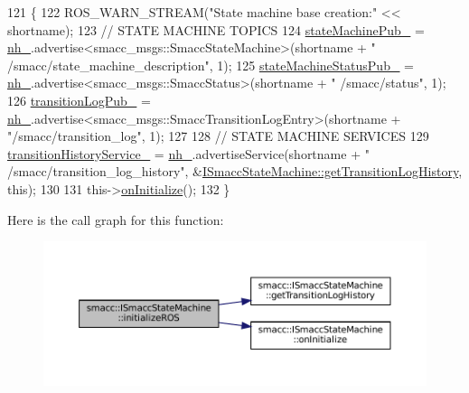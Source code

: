 \begin{DoxyCode}
121 \{
122     ROS\_WARN\_STREAM(\textcolor{stringliteral}{"State machine base creation:"} << shortname);
123     \textcolor{comment}{// STATE MACHINE TOPICS}
124     \hyperlink{classsmacc_1_1ISmaccStateMachine_af4aa9fed70bd4c57b19e3370fbd25de7}{stateMachinePub\_} = \hyperlink{classsmacc_1_1ISmaccStateMachine_ad8877bcca9dbb345fe72cca839c93dd3}{nh\_}.advertise<smacc\_msgs::SmaccStateMachine>(shortname + \textcolor{stringliteral}{"
      /smacc/state\_machine\_description"}, 1);
125     \hyperlink{classsmacc_1_1ISmaccStateMachine_a55a7c7b26ad4dfea441c62c6326a5414}{stateMachineStatusPub\_} = \hyperlink{classsmacc_1_1ISmaccStateMachine_ad8877bcca9dbb345fe72cca839c93dd3}{nh\_}.advertise<smacc\_msgs::SmaccStatus>(shortname + \textcolor{stringliteral}{"
      /smacc/status"}, 1);
126     \hyperlink{classsmacc_1_1ISmaccStateMachine_acc42eb050325c1edc77d81675fb1286a}{transitionLogPub\_} = \hyperlink{classsmacc_1_1ISmaccStateMachine_ad8877bcca9dbb345fe72cca839c93dd3}{nh\_}.advertise<smacc\_msgs::SmaccTransitionLogEntry>(shortname + \textcolor{stringliteral}{
      "/smacc/transition\_log"}, 1);
127 
128     \textcolor{comment}{// STATE MACHINE SERVICES}
129     \hyperlink{classsmacc_1_1ISmaccStateMachine_a73e2a7ca89c3d807eafe5cfb1e86ea05}{transitionHistoryService\_} = \hyperlink{classsmacc_1_1ISmaccStateMachine_ad8877bcca9dbb345fe72cca839c93dd3}{nh\_}.advertiseService(shortname + \textcolor{stringliteral}{"
      /smacc/transition\_log\_history"}, &\hyperlink{classsmacc_1_1ISmaccStateMachine_ae7c08fc2addf8ee4785f721050e6a763}{ISmaccStateMachine::getTransitionLogHistory}, \textcolor{keyword}{
      this});
130 
131     this->\hyperlink{classsmacc_1_1ISmaccStateMachine_ac2982c6c8283663e5e1e8a7c82f511ec}{onInitialize}();
132 \}
\end{DoxyCode}
Here is the call graph for this function\+:
\nopagebreak
\begin{figure}[H]
\begin{center}
\leavevmode
\includegraphics[width=350pt]{classsmacc_1_1ISmaccStateMachine_a1136dd5d81e846ac86de48bc71912cbf_cgraph}
\end{center}
\end{figure}
